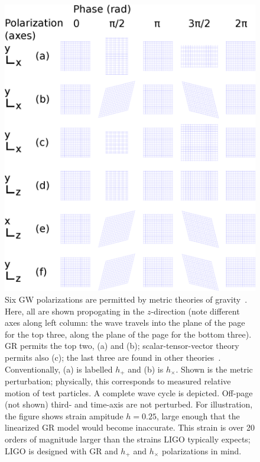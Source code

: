 \begin{figure}
\begin{center}
\includegraphics[width=130mm,keepaspectratio]{plots/postdefense/GW-polarizations.eps}
\caption{Six GW polarizations are permitted by metric theories of gravity~\cite{Will1993}. 
Here, all are shown propogating in the $z$-direction (note different axes along left column: the wave travels into the plane of the page for the top three, along the plane of the page for the bottom three).
GR permits the top two, (a) and (b); scalar-tensor-vector theory permits also (c); the last three are found in other theories~\cite{Will2001}.
Conventionally, (a) is labelled $h_+$ and (b) is $h_\times$.
Shown is the metric perturbation; physically, this corresponds to measured relative motion of test particles.
A complete wave cycle is depicted.
Off-page (not shown) third- and time-axis are not perturbed.
For illustration, the figure shows strain ampitude $h = 0.25$, large enough that the linearized GR model would become inaccurate.
This strain is over 20 orders of magnitude larger than the strains LIGO typically expects; LIGO is designed with GR and $h_+$ and $h_\times$ polarizations in mind.
}
\label{six-GW-polarizations-figure}
\end{center}
\end{figure}

